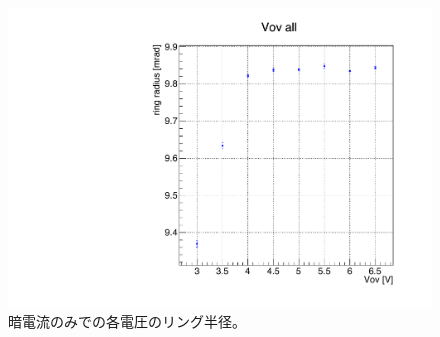 \documentclass[uplatex, titlepage, dvipdfmx, 12pt, a4paper]{jsreport}
\begin{document}
      \begin{figure}[hbtp]
        \begin{center} 
          \includegraphics[scale=0.4, clip]{image/background_radius.pdf}
          \caption{暗電流のみでの各電圧のリング半径。}
          \label{fig:darkcurrent_radius} 
        \end{center}
      \end{figure}
\end{document}
